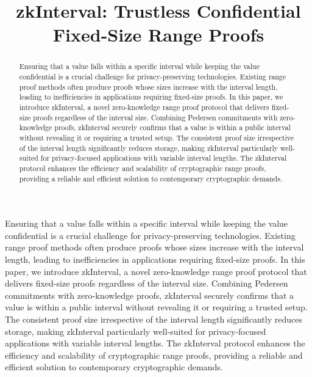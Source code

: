 \documentclass[version=preprint]{iacrcc}
\title[running = {zkInterval},
      ]{zkInterval: Trustless Confidential Fixed-Size Range Proofs}
\begin{document}
\maketitle


\begin{abstract}
  Ensuring that a value falls within a specific interval while keeping the value confidential is a crucial challenge for privacy-preserving technologies. Existing range proof methods often produce proofs whose sizes increase with the interval length, leading to inefficiencies in applications requiring fixed-size proofs. In this paper, we introduce zkInterval, a novel zero-knowledge range proof protocol that delivers fixed-size proofs regardless of the interval size. Combining Pedersen commitments with zero-knowledge proofs, zkInterval securely confirms that a value is within a public interval without revealing it or requiring a trusted setup. The consistent proof size irrespective of the interval length significantly reduces storage, making zkInterval particularly well-suited for privacy-focused applications with variable interval lengths. The zkInterval protocol enhances the efficiency and scalability of cryptographic range proofs, providing a reliable and efficient solution to contemporary cryptographic demands.
\end{abstract}

\begin{textabstract}
  Ensuring that a value falls within a specific interval while keeping the value confidential is a crucial challenge for privacy-preserving technologies. Existing range proof methods often produce proofs whose sizes increase with the interval length, leading to inefficiencies in applications requiring fixed-size proofs. In this paper, we introduce zkInterval, a novel zero-knowledge range proof protocol that delivers fixed-size proofs regardless of the interval size. Combining Pedersen commitments with zero-knowledge proofs, zkInterval securely confirms that a value is within a public interval without revealing it or requiring a trusted setup. The consistent proof size irrespective of the interval length significantly reduces storage, making zkInterval particularly well-suited for privacy-focused applications with variable interval lengths. The zkInterval protocol enhances the efficiency and scalability of cryptographic range proofs, providing a reliable and efficient solution to contemporary cryptographic demands.
\end{textabstract}
\end{document}
